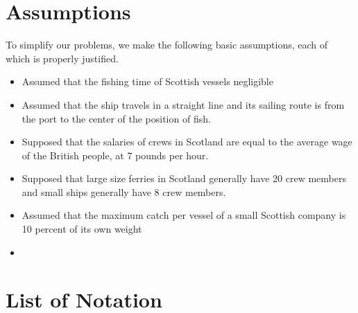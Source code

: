 \documentclass{mcmthesis}
\begin{document}
\section{Assumptions}
To simplify our problems, we make the following basic assumptions, each of which is properly justified.
\begin{itemize}
\item 
Assumed that the fishing time of Scottish vessels negligible
\item 
Assumed that the ship travels in a straight line and its sailing route is from the port to the center of the position of fish.
\item 
Supposed that the salaries of crews in Scotland are equal to the average wage of the British people, at 7 pounds per hour.
\item 
Supposed that large size ferries in Scotland generally have 20 crew members and small ships generally have 8 crew members.
\item 
Assumed that the maximum catch per vessel of a small Scottish company is 10 percent of its own weight
\item 

\end{itemize}

\section{List of Notation}
\end{document}
